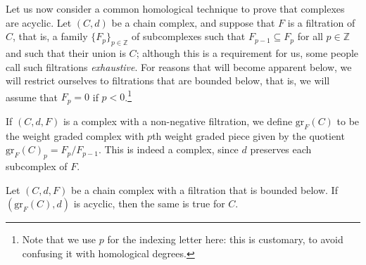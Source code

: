 %
%

Let us now consider a common homological technique to 
prove that complexes are acyclic. Let $(C,d)$ be
a chain complex, and suppose that $F$ is a filtration
of $C$, that is, a family 
$\{ F_p \}_{p\in\mathbb Z}$ of subcomplexes
such that $F_{p-1}\subseteq F_p$ for all
 $p\in \mathbb Z$ and such that their union is
 $C$; although this is a requirement for us, some
 people call such filtrations \emph{exhaustive}. For 
 reasons that will become apparent below,
 we will restrict ourselves to filtrations that are
 bounded below, that is, we will assume that $F_p=0$
 if $p<0$.\footnote{Note that we use $p$ for the
 indexing letter here: this is customary, to avoid
 confusing it with homological degrees.}
 
 If $(C,d,F)$ is a complex with a non-negative
 filtration, we define $\mathrm{gr}_F(C)$ to be
 the weight graded complex with $p$th weight
 graded piece given by
 the quotient $\mathrm{gr}_F(C)_p =   F_p/F_{p-1}$.
 This is indeed a complex, since $d$ preserves 
 each subcomplex of $F$.
 
 \begin{proposition}\label{prop:graded}
 Let $(C,d,F)$ be a chain
 complex with a filtration that is
 bounded below. If $(\mathrm{gr}_F(C),d)$ is
 acyclic, then the same is true for $C$.
\end{proposition}  
  
